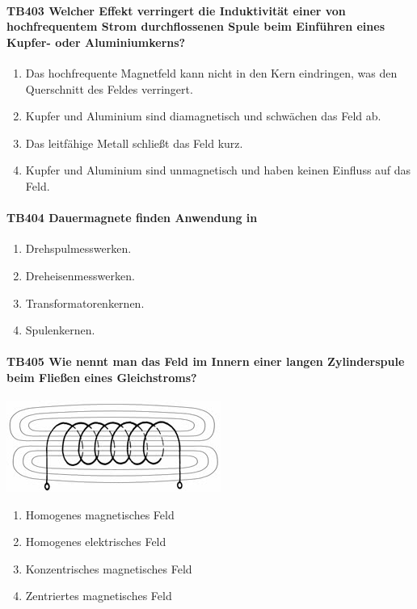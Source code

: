 \documentclass[8pt]{article}
\begin{document}
\begin{enumerate}
\paragraph*{TB403 Welcher Effekt verringert die Induktivität einer von hochfrequentem Strom durchflossenen Spule beim Einführen eines Kupfer- oder Aluminiumkerns?}
\begin{enumerate}[nolistsep,label=\Alph*]
\item Das hochfrequente Magnetfeld kann nicht in den Kern eindringen, was den Querschnitt des Feldes verringert.
\item Kupfer und Aluminium sind diamagnetisch und schwächen das Feld ab. 
\item Das leitfähige Metall schließt das Feld kurz. 
\item Kupfer und Aluminium sind unmagnetisch und haben keinen Einfluss auf das Feld.
\end{enumerate}



\paragraph*{TB404 Dauermagnete finden Anwendung in}
\begin{enumerate}[nolistsep,label=\Alph*]
\item Drehspulmesswerken.
\item Dreheisenmesswerken.
\item Transformatorenkernen.
\item Spulenkernen.
\end{enumerate}



\paragraph*{TB405 Wie nennt man das Feld im Innern einer langen Zylinderspule beim Fließen eines Gleichstroms?}
\begin{center}
	\begin{minipage}{\linewidth}
		\centering
		\includegraphics[scale=0.7]{pics/tb405_a.jpg}
	\end{minipage}
\end{center}
\begin{enumerate}[nolistsep,label=\Alph*]
\item Homogenes magnetisches Feld
\item Homogenes elektrisches Feld
\item Konzentrisches magnetisches Feld
\item Zentriertes magnetisches Feld
\end{enumerate}




\end{enumerate}
\end{document}
